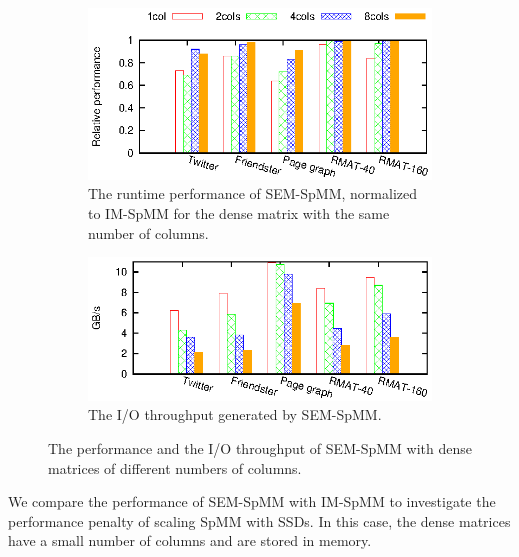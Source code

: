 \begin{figure}
	\footnotesize
	\centering
	\begin{subfigure}[b]{0.5\textwidth}
		\centering
		\includegraphics[scale=1]{SpMM_figs/spmm_im_vs_sem.eps}
		\vspace{-5pt}
		\caption{The runtime performance of SEM-SpMM, normalized to IM-SpMM
		for the dense matrix with the same number of columns.}
		\label{perf:spmm_comp}
	\end{subfigure}
	\begin{subfigure}[b]{0.5\textwidth}
		\centering
		\vspace{5pt}
		\includegraphics[scale=1]{SpMM_figs/spmm_IO.eps}
		\vspace{-5pt}
		\caption{The I/O throughput generated by SEM-SpMM.}
		\label{perf:spmm_IO}
	\end{subfigure}
	\vspace{3pt}
	\caption{The performance and the I/O throughput of SEM-SpMM with dense
	matrices of different numbers of columns.}
	\label{perf:spmm_IM_vs_SEM}
\end{figure}

We compare the performance of SEM-SpMM with IM-SpMM to investigate
the performance penalty of scaling SpMM with SSDs. In this case, the dense
matrices have a small number of columns and are stored in memory. 

